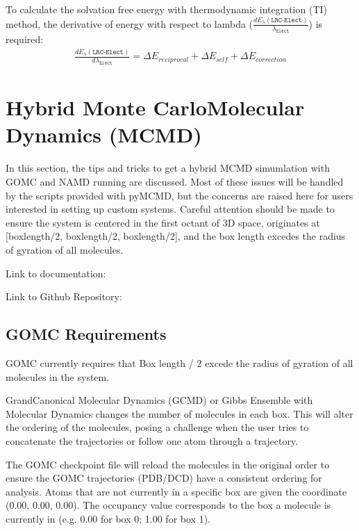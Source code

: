 \documentclass[letterpaper,10pt,english]{sphinxmanual}
\begin{document}
\sphinxAtStartPar
To calculate the solvation free energy with thermodynamic integration (TI) method, the derivative of energy with
respect to lambda (\(\frac{dE_{\lambda}(\texttt{LRC-Elect})}{\lambda_{\texttt{Elect}}}\)) is required:
\begin{equation*}
\begin{split}\frac{dE_{\lambda}(\texttt{LRC-Elect})}{d\lambda_{\texttt{Elect}}} = \Delta E_{reciprocal} + \Delta E_{self} + \Delta E_{correction}\end{split}
\end{equation*}

\chapter{Hybrid Monte Carlo\sphinxhyphen{}Molecular Dynamics (MCMD)}
\label{\detokenize{hybrid_MC_MD:hybrid-monte-carlo-molecular-dynamics-mcmd}}\label{\detokenize{hybrid_MC_MD::doc}}
\sphinxAtStartPar
In this section, the tips and tricks to get a hybrid MCMD simumlation with GOMC and NAMD running are discussed.
Most of these issues will be handled by the scripts provided with py\sphinxhyphen{}MCMD, but the concerns are raised here for users interested in setting up custom systems.  Careful attention should be made to ensure the system is centered in the first octant of 3D space, originates at {[}boxlength/2, boxlength/2, boxlength/2{]}, and the box length excedes the radius of gyration of all molecules.

\sphinxAtStartPar
Link to documentation: 

\sphinxAtStartPar
Link to Github Repository: 


\section{GOMC Requirements}
\label{\detokenize{hybrid_MC_MD:gomc-requirements}}
\sphinxAtStartPar
GOMC currently requires that Box length / 2 excede the radius of gyration of all molecules in the system.

\sphinxAtStartPar
Grand\sphinxhyphen{}Canonical Molecular Dynamics (GCMD) or Gibbs Ensemble with Molecular Dynamics changes the number of molecules in each box.  This will alter the ordering of the molecules, posing a challenge when the user tries to concatenate the trajectories or follow one atom through a trajectory.

\sphinxAtStartPar
The GOMC checkpoint file will reload the molecules in the original order to ensure the GOMC trajectories (PDB/DCD) have a consistent ordering for analysis.  Atoms that are not currently in a specific box are given the coordinate (0.00, 0.00, 0.00). The occupancy value corresponds to the box a molecule is currently in (e.g. 0.00 for box 0; 1.00 for box 1).
\end{document}
